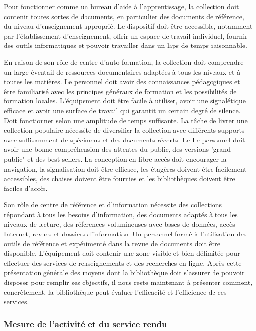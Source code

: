 \documentclass[french,a4paper,12pt]{article}
\begin{document}
\quad Pour fonctionner comme un bureau d'aide à l'apprentissage, la collection doit contenir toutes sortes de documents, en particulier des documents de référence, du niveau d'enseignement approprié. Le dispositif doit être accessible, notamment par l'établissement d'enseignement, offrir un espace de travail individuel, fournir des outils informatiques et pouvoir travailler dans un laps de temps raisonnable. 

\quad En raison de son rôle de centre d'auto formation, la collection doit comprendre un large éventail de ressources documentaires adaptées à tous les niveaux et à toutes les matières. Le personnel doit avoir des connaissances pédagogiques et être familiarisé avec les principes généraux de formation et les possibilités de formation locales. L'équipement doit être facile à utiliser, avoir une signalétique efficace et avoir une surface de travail qui garantit un certain degré de silence. Doit fonctionner selon une amplitude de temps suffisante. La tâche de livrer une collection populaire nécessite de diversifier la collection avec différents supports avec suffisamment de spécimens et des documents récents. Le Le personnel doit avoir une bonne compréhension des attentes du public, des versions "grand public" et des best-sellers. La conception en libre accès doit encourager la navigation, la signalisation doit être efficace, les étagères doivent être facilement accessibles, des chaises doivent être fournies et les bibliothèques doivent être faciles d'accès. 

\quad Son rôle de centre de référence et d'information nécessite des collections répondant à tous les besoins d'information, des documents adaptés à tous les niveaux de lecture, des références volumineuses avec bases de données, accès Internet, revues et dossiers d'information. Un personnel formé à l'utilisation des outils de référence et expérimenté dans la revue de documents doit être disponible. L'équipement doit contenir une zone visible et bien délimitée pour effectuer des services de renseignements et des recherches en ligne. 
Après cette présentation générale des moyens dont la bibliothèque doit s’assurer de pouvoir disposer pour remplir ses objectifs, il nous reste maintenant à présenter comment, concrètement, la bibliothèque peut évaluer l’efficacité et l’efficience de ces services. 


\subsubsection{Mesure de l’activité et du service rendu} \citep{Gouyon}
\end{document}
